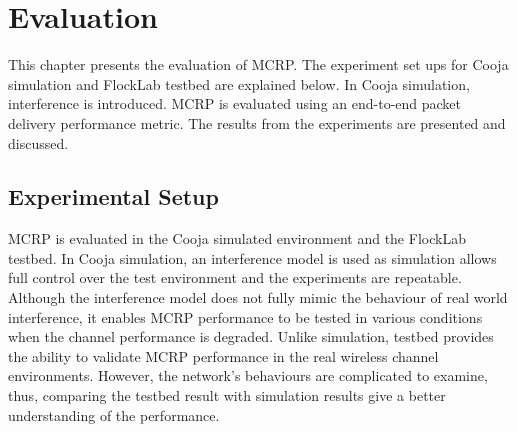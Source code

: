 \chapter{Evaluation}
\label{results}


This chapter presents the evaluation of MCRP. The experiment set ups for Cooja simulation and FlockLab \cite{flocklab} testbed are explained below. In Cooja simulation, interference is introduced. MCRP is evaluated using an end-to-end packet delivery performance metric. The results from the experiments are presented and discussed. 


\section{Experimental Setup}
MCRP is evaluated in the Cooja simulated environment and the FlockLab testbed. In Cooja simulation, an interference model is used as simulation allows full control over the test environment and the experiments are repeatable. Although the interference model does not fully mimic the behaviour of real world interference, it enables MCRP performance to be tested in various conditions when the channel performance is degraded. Unlike simulation, testbed provides the ability to validate MCRP performance in the real wireless channel environments. However, the network's behaviours are complicated to examine, thus, comparing the testbed result with simulation results give a better understanding of the performance. 


